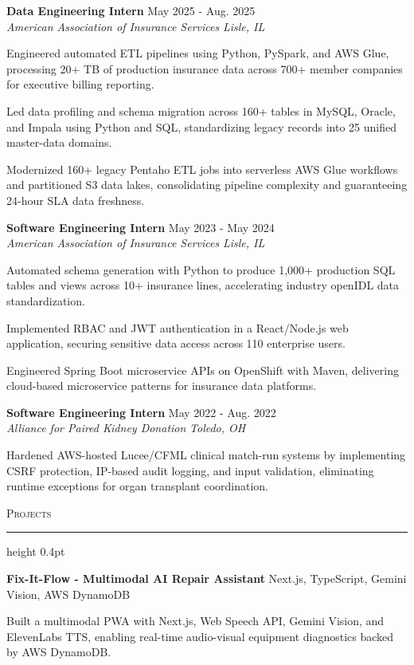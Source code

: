 \documentclass[letterpaper,11pt]{article}
\newcommand{\resumesection}[1]{%
  \par\vspace{2pt}%
  {\large\scshape #1}\par\vspace{2pt}%
  \hrule height 0.4pt\vspace{2pt}%
}
\newcommand{\resumeSubheading}[4]{
  \textbf{#1} \hfill #2\\
  \textit{#3} \hfill \textit{#4}
}
\newcommand{\projectHeading}[2]{
  \textbf{#1} \hfill #2
}
\begin{document}
\resumeSubheading
{Data Engineering Intern}{May 2025 - Aug. 2025}
{American Association of Insurance Services}{Lisle, IL}
\begin{tightitemize}
  \item Engineered automated ETL pipelines using Python, PySpark, and AWS Glue, processing 20+ TB of production insurance data across 700+ member companies for executive billing reporting.
  \item Led data profiling and schema migration across 160+ tables in MySQL, Oracle, and Impala using Python and SQL, standardizing legacy records into 25 unified master-data domains.
  \item Modernized 160+ legacy Pentaho ETL jobs into serverless AWS Glue workflows and partitioned S3 data lakes, consolidating pipeline complexity and guaranteeing 24-hour SLA data freshness.
\end{tightitemize}

\resumeSubheading
{Software Engineering Intern}{May 2023 - May 2024}
{American Association of Insurance Services}{Lisle, IL}
\begin{tightitemize}
  \item Automated schema generation with Python to produce 1,000+ production SQL tables and views across 10+ insurance lines, accelerating industry openIDL data standardization.
  \item Implemented RBAC and JWT authentication in a React/Node.js web application, securing sensitive data access across 110 enterprise users.
  \item Engineered Spring Boot microservice APIs on OpenShift with Maven, delivering cloud-based microservice patterns for insurance data platforms.
\end{tightitemize}

\resumeSubheading
{Software Engineering Intern}{May 2022 - Aug. 2022}
{Alliance for Paired Kidney Donation}{Toledo, OH}
\begin{tightitemize}
  \item Hardened AWS-hosted Lucee/CFML clinical match-run systems by implementing CSRF protection, IP-based audit logging, and input validation, eliminating runtime exceptions for organ transplant coordination.
\end{tightitemize}

\resumesection{Projects}
\projectHeading{Fix-It-Flow - Multimodal AI Repair Assistant}{Next.js, TypeScript, Gemini Vision, AWS DynamoDB}
\begin{tightitemize}
  \item Built a multimodal PWA with Next.js, Web Speech API, Gemini Vision, and ElevenLabs TTS, enabling real-time audio-visual equipment diagnostics backed by AWS DynamoDB.
\end{tightitemize}
\end{document}

